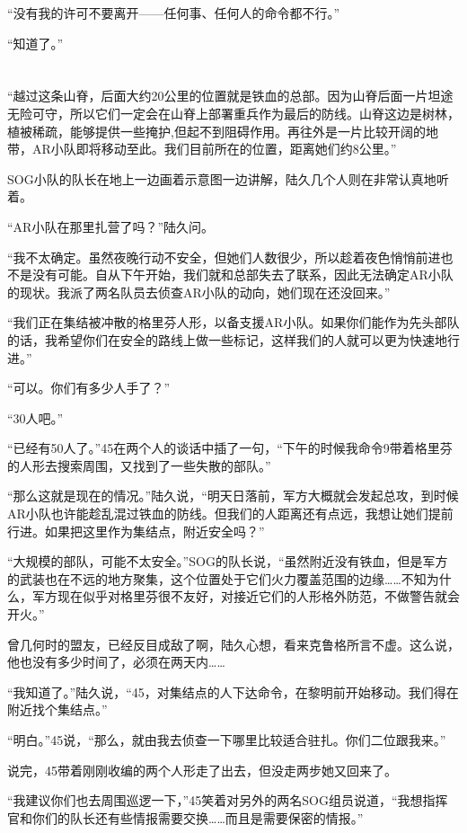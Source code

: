 “没有我的许可不要离开——任何事、任何人的命令都不行。”

“知道了。”

\section*{}

“越过这条山脊，后面大约20公里的位置就是铁血的总部。因为山脊后面一片坦途无险可守，所以它们一定会在山脊上部署重兵作为最后的防线。山脊这边是树林，植被稀疏，能够提供一些掩护,但起不到阻碍作用。再往外是一片比较开阔的地带，AR小队即将移动至此。我们目前所在的位置，距离她们约8公里。”

SOG小队的队长在地上一边画着示意图一边讲解，陆久几个人则在非常认真地听着。

“AR小队在那里扎营了吗？”陆久问。

“我不太确定。虽然夜晚行动不安全，但她们人数很少，所以趁着夜色悄悄前进也不是没有可能。自从下午开始，我们就和总部失去了联系，因此无法确定AR小队的现状。我派了两名队员去侦查AR小队的动向，她们现在还没回来。”

“我们正在集结被冲散的格里芬人形，以备支援AR小队。如果你们能作为先头部队的话，我希望你们在安全的路线上做一些标记，这样我们的人就可以更为快速地行进。”

“可以。你们有多少人手了？”

“30人吧。”

“已经有50人了。”45在两个人的谈话中插了一句，“下午的时候我命令9带着格里芬的人形去搜索周围，又找到了一些失散的部队。”

“那么这就是现在的情况。”陆久说，“明天日落前，军方大概就会发起总攻，到时候AR小队也许能趁乱混过铁血的防线。但我们的人距离还有点远，我想让她们提前行进。如果把这里作为集结点，附近安全吗？”

“大规模的部队，可能不太安全。”SOG的队长说，“虽然附近没有铁血，但是军方的武装也在不远的地方聚集，这个位置处于它们火力覆盖范围的边缘……不知为什么，军方现在似乎对格里芬很不友好，对接近它们的人形格外防范，不做警告就会开火。”

曾几何时的盟友，已经反目成敌了啊，陆久心想，看来克鲁格所言不虚。这么说，他也没有多少时间了，必须在两天内……

“我知道了。”陆久说，“45，对集结点的人下达命令，在黎明前开始移动。我们得在附近找个集结点。”

“明白。”45说，“那么，就由我去侦查一下哪里比较适合驻扎。你们二位跟我来。”

说完，45带着刚刚收编的两个人形走了出去，但没走两步她又回来了。

“我建议你们也去周围巡逻一下，”45笑着对另外的两名SOG组员说道，“我想指挥官和你们的队长还有些情报需要交换……而且是需要保密的情报。”

